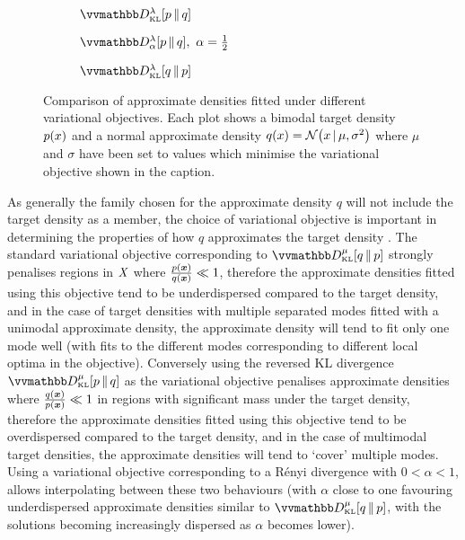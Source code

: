 \begin{figure}[t]
\centering
\begin{subfigure}[b]{.32\linewidth}
\centering
{}
\caption{$\kldiv[\lambda]{\tgtdens}{q}$}
\label{sfig:var-obj-kl-pq}
\end{subfigure}
\begin{subfigure}[b]{.32\linewidth}
\centering
{}
\caption{$\rdiv[\lambda]{\alpha}{\tgtdens}{q},~\alpha=\frac{1}{2}$}
\label{sfig:var-obj-renyi}
\end{subfigure}
\begin{subfigure}[b]{.32\linewidth}
\centering
{}
\caption{$\kldiv[\lambda]{q}{\tgtdens}$}
\label{sfig:var-obj-kl-qp}
\end{subfigure}
\caption[Variational objective comparison.]{Comparison of approximate densities fitted under different variational objectives. Each plot shows a bimodal target density $p(x)$ and a normal approximate density $q(x) = \nrm{x \gvn \mu,\sigma^2}$ where $\mu$ and $\sigma$ have been set to values which minimise the variational objective shown in the caption.}
\label{fig:variational-objective-comparison}
\end{figure}

As generally the family chosen for the approximate density $q$ will not include the target density as a member, the choice of variational objective is important in determining the properties of how $q$ approximates the target density \citep{bishop2006pattern}. The standard variational objective corresponding to $\kldiv[\mu]{q}{\tgtdens}$ strongly penalises regions in $\mathit{X}$ where $\frac{p(\boldsymbol{x})}{q(\boldsymbol{x})} \ll  1$, therefore the approximate densities fitted using this objective tend to be underdispersed compared to the target density, and in the case of target densities with multiple separated modes fitted with a unimodal approximate density, the approximate density will tend to fit only one mode well (with fits to the different modes corresponding to different local optima in the objective). Conversely using the reversed \ac{KL} divergence $\kldiv[\mu]{\tgtdens}{q}$ as the variational objective penalises approximate densities where $\frac{q(\boldsymbol{x})}{p(\boldsymbol{x})} \ll 1$ in regions with significant mass under the target density, therefore the approximate densities fitted using this objective tend to be overdispersed compared to the target density, and in the case of multimodal target densities, the approximate densities will tend to `cover' multiple modes. Using a variational objective corresponding to a R\'{e}nyi divergence with $0 < \alpha < 1$, allows interpolating between these two behaviours (with $\alpha$ close to one favouring underdispersed approximate densities similar to $\kldiv[\mu]{q}{\tgtdens}$, with the solutions becoming increasingly dispersed as $\alpha$ becomes lower). 

